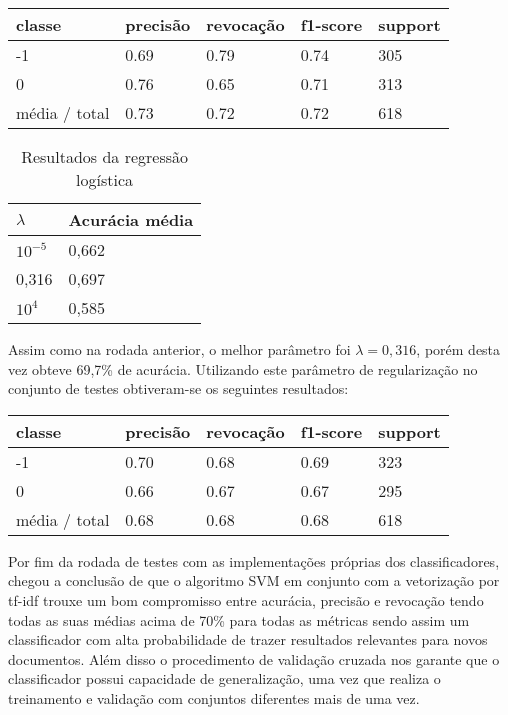 \begin{table}[H]
	\centering
		\begin{tabular}{l | l | l | l | l}
		\hline
		classe  	&	precisão  &  revocação &  f1-score &  support \\
		\hline
		 -1    &   0.69   &   0.79   &   0.74   &    305 \\
		 \hline
          0    &   0.76   &   0.65   &   0.71   &    313 \\
		\hline
		média / total   &    0.73   &   0.72   &   0.72   &    618 \\
		\hline
	\end{tabular}
\end{table}

\begin{table}[H]
	\centering
	\caption{Resultados da regressão logística}
	\begin{tabular}{l l}
		\hline
		$\lambda$ & Acurácia média \\
		\hline
		$10^{-5}$ & 0,662 \\
		\hline
		0,316 & 0,697 \\
		\hline
		$10^{4}$ & 0,585 \\
	\end{tabular}
\end{table}

Assim como na rodada anterior, o melhor parâmetro foi $\lambda = 0,316$, porém desta vez obteve
69,7\% de acurácia. Utilizando este parâmetro de regularização no conjunto de testes obtiveram-se
os seguintes resultados:

\begin{table}[H]
	\centering
		\begin{tabular}{l | l | l | l | l}
		\hline
		classe  	&	precisão  &  revocação &  f1-score &  support \\
		\hline
		 -1    &   0.70   &   0.68   &   0.69   &    323 \\
		 \hline
          0    &   0.66   &   0.67   &   0.67   &    295 \\
		\hline
		média / total   &    0.68   &   0.68   &   0.68   &    618 \\
		\hline
	\end{tabular}
\end{table}

Por fim da rodada de testes com as implementações próprias dos classificadores, chegou
a conclusão de que o algoritmo SVM em conjunto com a vetorização por tf-idf trouxe um bom
compromisso entre acurácia, precisão e revocação tendo todas as suas médias acima de 70\%
para todas as métricas sendo assim um classificador com alta probabilidade de trazer resultados
relevantes para novos documentos. Além disso o procedimento de validação cruzada nos garante
que o classificador possui capacidade de generalização, uma vez que realiza o treinamento e
validação com conjuntos diferentes mais de uma vez.

